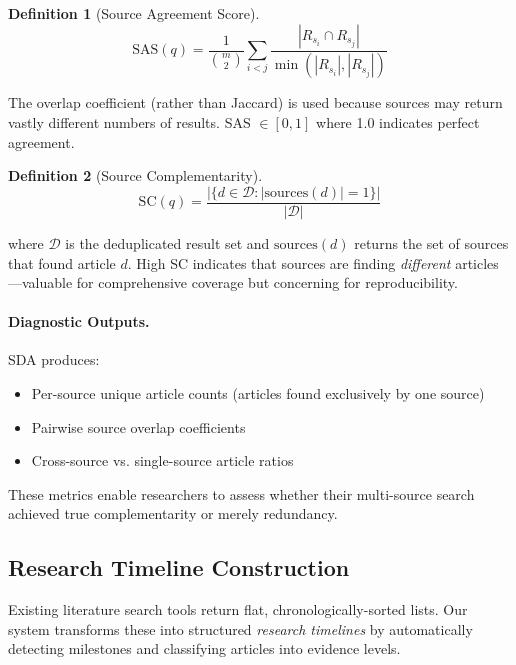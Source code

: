 \documentclass[11pt,a4paper]{article}
\newtheorem{definition}{Definition}
\begin{document}
\begin{definition}[Source Agreement Score]
\begin{equation}
\text{SAS}(q) = \frac{1}{\binom{m}{2}} \sum_{i<j} \frac{|R_{s_i} \cap R_{s_j}|}{\min(|R_{s_i}|, |R_{s_j}|)}
\label{eq:sas}
\end{equation}
\end{definition}

The overlap coefficient (rather than Jaccard) is used because sources may return vastly different numbers of results.
SAS $\in [0, 1]$ where 1.0 indicates perfect agreement.

\begin{definition}[Source Complementarity]
\begin{equation}
\text{SC}(q) = \frac{|\{d \in \mathcal{D} : |\text{sources}(d)| = 1\}|}{|\mathcal{D}|}
\label{eq:sc}
\end{equation}
\end{definition}

where $\mathcal{D}$ is the deduplicated result set and $\text{sources}(d)$ returns the set of sources that found article $d$.
High SC indicates that sources are finding \emph{different} articles---valuable for comprehensive coverage but concerning for reproducibility.

\paragraph{Diagnostic Outputs.}
SDA produces:
\begin{itemize}
    \item Per-source unique article counts (articles found exclusively by one source)
    \item Pairwise source overlap coefficients
    \item Cross-source vs. single-source article ratios
\end{itemize}

These metrics enable researchers to assess whether their multi-source search achieved true complementarity or merely redundancy.

\subsection{Research Timeline Construction}
\label{sec:timeline}

Existing literature search tools return flat, chronologically-sorted lists.
Our system transforms these into structured \emph{research timelines} by automatically detecting milestones and classifying articles into evidence levels.
\end{document}
